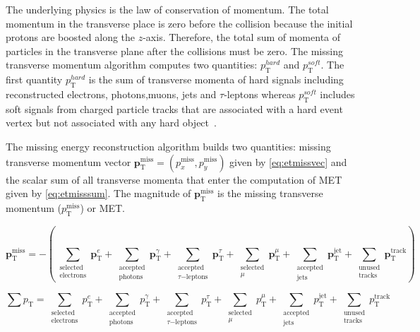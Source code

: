 The underlying physics is the law of conservation of momentum. The total momentum in the transverse place is zero before the collision because 
the initial protons are boosted along the $z$-axis. Therefore, the total sum of momenta of particles in the transverse plane after the collisions must be zero. 
The missing transverse momentum algorithm computes two quantities: $p_{\text{T}}^{hard}$ and $p_{\text{T}}^{soft}$. The first quantity $p_{\text{T}}^{hard}$ 
is the sum of transverse momenta of hard signals including reconstructed electrons, photons,muons, jets and $\tau$-leptons whereas $p_{\text{T}}^{soft}$ includes
soft signals from charged particle tracks that are associated with a hard event vertex but not associated with any hard object~\cite{ATLAS:2024cmj}. 

The missing energy reconstruction algorithm builds two quantities: missing transverse momentum vector $\boldsymbol{p}_{\text{T}}^{\text{miss}} = (p_x^{\text{miss}},p_y^{\text{miss}})$ 
given by \cref{eq:etmissvec} and the scalar sum of all transverse momenta that enter the computation of MET
given by \cref{eq:etmisssum}. The magnitude of $\boldsymbol{p}_{\text{T}}^{\text{miss}}$ is the missing transverse momentum ($p_{\text{T}}^{\text{miss}}$) or
MET. 

\begin{equation}
    \boldsymbol{p}_\text{T}^{\text{miss}} = - \left( 
    \sum_{\substack{\mathrm{selected} \\ \mathrm{electrons}}} \boldsymbol{p}_\text{T}^e + 
    \sum_{\substack{\mathrm{accepted} \\ \mathrm{photons}}} \boldsymbol{p}_\text{T}^\gamma + 
    \sum_{\substack{\mathrm{accepted} \\ \tau \mathrm{-leptons}}} \boldsymbol{p}_\text{T}^\tau + 
    \sum_{\substack{\mathrm{selected} \\ \mu}} \boldsymbol{p}_\text{T}^\mu + 
    \sum_{\substack{\mathrm{accepted} \\ \mathrm{jets}}} \boldsymbol{p}_\text{T}^{\text{jet}} + 
    \sum_{\substack{\mathrm{unused} \\ \mathrm{tracks}}} \boldsymbol{p}_\text{T}^{\mathrm{track}} \right)
    \label{eq:etmissvec}    
\end{equation}

\begin{equation}
    \sum p_\text{T} = 
    \sum_{\substack{\mathrm{selected} \\ \mathrm{electrons}}} p_\text{T}^e + 
    \sum_{\substack{\mathrm{accepted} \\ \mathrm{photons}}} p_\text{T}^\gamma + 
    \sum_{\substack{\mathrm{accepted} \\ \tau \mathrm{-leptons}}} p_\text{T}^\tau + 
    \sum_{\substack{\mathrm{selected} \\ \mu}} p_\text{T}^\mu + 
    \sum_{\substack{\mathrm{accepted} \\ \mathrm{jets}}} p_\text{T}^{\text{jet}} + 
    \sum_{\substack{\mathrm{unused} \\ \mathrm{tracks}}} p_\text{T}^{\mathrm{track}}
    \label{eq:etmisssum}    
\end{equation}

